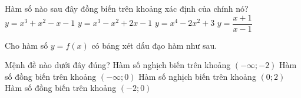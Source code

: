 \begin{ex}%
Hàm số nào sau đây đồng biến trên khoảng xác định của chính nó?
\choice
{$y=x^3+x^2-x-1$}
{\True $y=x^3-x^2+2x-1$}
{$y=x^4-2x^2+3$}
{$y=\dfrac{x+1}{x-1}$}
\end{ex}

\begin{ex}%
Cho hàm số $y=f(x)$ có bảng xét dấu đạo hàm như sau.
\begin{center}
\end{center}
Mệnh đề nào dưới đây đúng?
\choice
{Hàm số nghịch biến trên khoảng $(-\infty;-2)$}
{Hàm số đồng biến trên khoảng $(-\infty;0)$}
{\True Hàm số nghịch biến trên khoảng $(0;2)$}
{Hàm số đồng biến trên khoảng $(-2;0)$}
\end{ex}


